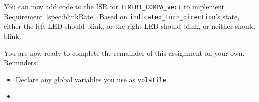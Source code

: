 You can now add code to the ISR for \lstinline{TIMER1_COMPA_vect} to implement Requirement~\ref{spec:blinkRate}.
Based on \lstinline{indicated_turn_direction}'s state, either the left LED should blink, or the right LED should blink, or neither should blink.


\vspace{1cm}

You are now ready to complete the remainder of this assignment on your own.
Reminders:
\begin{itemize}
    \item Declare any global variables you use as \lstinline{volatile}.
    \item \collaborationrules
\end{itemize}